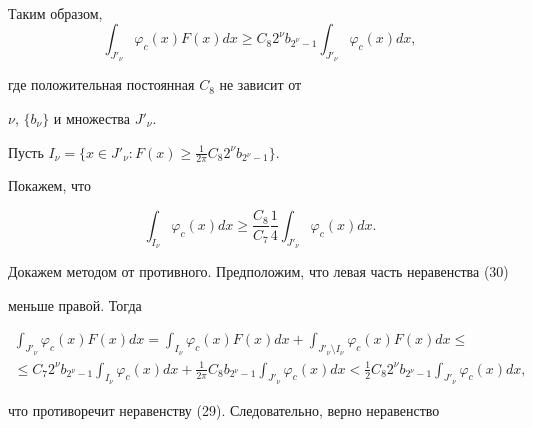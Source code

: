 \begin{pf}
\begin{multline*}
\end{multline*}


Таким образом, \\


\begin{equation}


\int_{J'_\nu} \varphi_c(x) F(x) dx \geq


C_8 2^\nu b_{2^\nu-1} \int_{J'_\nu} \varphi_c(x) dx,


\end{equation}


где положительная постоянная $C_8$ не зависит от


$\nu$, $\{b_\nu\}$ и множества $J'_\nu$.





Пусть $I_\nu = \{x \in J'_\nu : F(x)\geq 


\frac{1}{2\pi} C_8 2^\nu b_{2^\nu-1}\}$.


Покажем, что


\begin{equation}


\int_{I_\nu} \varphi_c(x) dx \geq


\frac{C_8}{C_7} \frac{1}{4} \int_{J'_\nu} \varphi_c(x)dx.


\end{equation}


Докажем методом от противного. Предположим, что левая часть неравенства (30)


меньше правой. Тогда


\begin{multline*}


\int_{J'_\nu} \varphi_c(x) F(x) dx= \int_{I_\nu}


\varphi_c(x) F(x)dx + \int_{J'_\nu\setminus I_\nu} 


\varphi_c(x) F(x) dx \leq\\


%


\le C_7 2^\nu b_{2^\nu -1} \int_{I_\nu} \varphi_c(x) dx +


\frac{1}{2\pi} C_8 b_{2^\nu -1} \int_{J'_\nu} \varphi_c(x)


dx < \frac{1}{2} C_8 2^\nu b_{2^\nu - 1}


\int_{J'_\nu} \varphi_c(x) dx,


\end{multline*}


что противоречит неравенству (29). Следовательно, верно неравенство



\end{pf}
